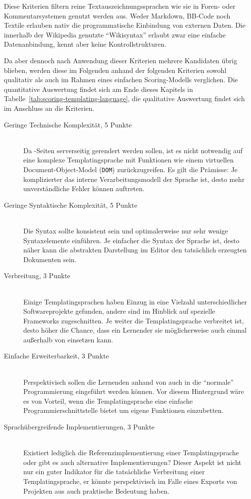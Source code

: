 Diese Kriterien filtern reine Textauszeichnungssprachen wie sie in Foren- oder Kommentarsystemen genutzt werden aus. Weder Markdown, BB-Code noch Textile erlauben nativ die programmatische Einbindung von externen Daten. Die innerhalb der Wikipedia genutzte "`Wikisyntax"' erlaubt zwar eine einfache Datenanbindung, kennt aber keine Kontrollstrukturen.

Da aber dennoch nach Anwendung dieser Kriterien mehrere Kandidaten übrig blieben, werden diese im Folgenden anhand der folgenden Kriterien sowohl qualitativ als auch im Rahmen eines einfachen Scoring-Modells verglichen. Die quantitative Auswertung findet sich am Ende dieses Kapitels in Tabelle~\ref{tab:scoring-templating-language}, die qualitative Auswertung findet sich im Anschluss an die Kriterien.

\begin{description}
\item[Geringe Technische Komplexität, 5 Punkte] \hfill \\
  Da \idename{}-Seiten serverseitig gerendert werden sollen, ist es nicht notwendig auf eine komplexe Templatingsprache mit Funktionen wie einem virtuellen Document-Object-Model (\texttt{DOM}) zurückzugreifen. Es gilt die Prämisse: Je komplizierter das interne Verarbeitungsmodell der Sprache ist, desto mehr unverständliche Fehler können auftreten.
\item[Geringe Syntaktische Komplexität, 5 Punkte] \hfill \\
  Die Syntax sollte konsistent sein und optimalerweise nur sehr wenige Syntaxelemente einführen. Je einfacher die Syntax der Sprache ist, desto näher kann die abstrakten Darstellung im Editor den tatsächlich erzeugten Dokumenten sein.
\item[Verbreitung, 3 Punkte] \hfill \\
  Einige Templatingsprachen haben Einzug in eine Vielzahl unterschiedlicher Softwareprojekte gefunden, andere sind im Hinblick auf spezielle Frameworks zugeschnitten. Je weiter die Templatingsprache verbreitet ist, desto höher die Chance, dass ein Lernender sie möglicherweise auch einmal außerhalb von \idename{} einsetzen kann.
\item[Einfache Erweiterbarkeit, 3 Punkte] \hfill \\
  Perspektivisch sollen die Lernenden anhand von \idename{} auch in die "`normale"' Programmierung eingeführt werden können. Vor diesem Hintergrund wäre es von Vorteil, wenn die Templatingsprache eine einfache Programmierschnittstelle bietet um eigene Funktionen einzubetten.
\item[Sprachübergreifende Implementierungen, 3 Punkte] \hfill \\
  Existiert lediglich die Referenzimplementierung einer Templatingsprache oder gibt es auch alternative Implementierungen? Dieser Aspekt ist nicht nur ein guter Indikator für die tatsächliche Verbreitung einer Templatingsprache, er könnte perspektivisch im Falle eines Exports von Projekten aus \idename{} auch praktische Bedeutung haben.
\end{description}

